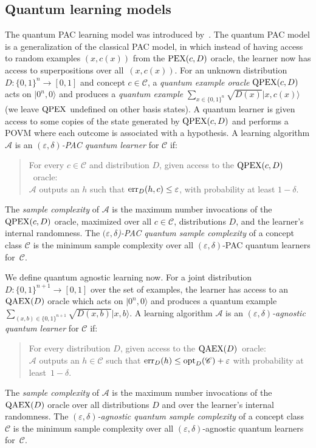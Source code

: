 \documentclass[twoside,11pt]{article}
\newcommand{\eps}{\varepsilon}
\newcommand{\ket}[1]{|#1\rangle}
\newcommand{\PEX}{\mbox{\rm PEX}}
\newcommand{\QPEX}{\mbox{\rm QPEX}}
\newcommand{\QAEX}{\mbox{\rm QAEX}}
\newcommand{\err}{\mbox{\rm err}}
\newcommand{\opt}{\mbox{\rm opt}}
\newcommand{\A}{\ensuremath{\mathcal{A}}}
\def\01{\{0,1\}}
\newcommand{\C}{\ensuremath{\mathscr{C}}}
\begin{document}
\subsection{Quantum learning models}
The quantum PAC learning model was introduced by~\cite{bshouty:quantumpac}. The quantum PAC model is a generalization of the classical PAC model, in which instead of having access to random examples $(x,c(x))$ from the $\PEX(c,D)$ oracle, the learner now has access to superpositions over all~$(x,c(x))$. For an unknown distribution $D:\01^n\rightarrow [0,1]$ and concept $c\in \C$, a \emph{quantum example oracle} $\QPEX(c,D)$ acts on $\ket{0^n,0}$ and produces a \emph{quantum example} $\sum_{x\in \01^n} \sqrt{D(x)} \ket{x,c(x)}$ (we leave $\QPEX$ undefined on other basis states). A quantum learner is given access to some copies of the state generated by $\QPEX(c,D)$ and performs a POVM where each outcome is associated with a hypothesis. A learning algorithm $\A$ is an \emph{$(\eps,\delta)$-PAC quantum learner} for $\C$ if: 
\begin{quote}
	For every $c\in \C$ and distribution $D$, given access to the $\QPEX(c,D)$~oracle:\\ 
	$\A$ outputs an $h$ such that $\err_D(h,c)\leq \eps$, with probability at least $1-\delta$. 
\end{quote}
The \emph{sample complexity} of $\A$ is the maximum number invocations of the $\QPEX(c,D)$ oracle, maximized over all $c\in \C$, distributions $D$, and the learner's internal randomness. The \emph{$(\eps,\delta$)-PAC quantum sample complexity} of a concept class $\C$ is the minimum sample complexity over all $(\eps,\delta)$-PAC quantum learners for~$\C$. 

We define quantum agnostic learning now. For a joint distribution $D:\01^{n+1}\rightarrow [0,1]$ over the set of examples, the learner has access to an $\QAEX(D)$  oracle which acts on $\ket{0^n,0}$ and produces a quantum example $\sum_{(x,b)\in \01^{n+1}} \sqrt{D(x,b)} \ket{x,b}$. A learning algorithm $\A$ is an \emph{$(\eps,\delta)$-agnostic quantum learner} for $\C$ if: 
\begin{quote}
	For every distribution $D$, given access to the $\QAEX(D)$~oracle: \\
	$\A$ outputs an $h\in\C$ such that $\err_D(h)\leq \opt_D(\C)+\eps$ with probability at least~$1-\delta$.
\end{quote}
The \emph{sample complexity} of $\A$ is the maximum number invocations of the $\QAEX(D)$ oracle over all distributions $D$ and over the learner's internal randomness. The \emph{$(\eps,\delta)$-agnostic quantum sample complexity} of a concept class $\C$ is the minimum sample complexity over all $(\eps,\delta)$-agnostic quantum learners for~$\C$.
\end{document}
